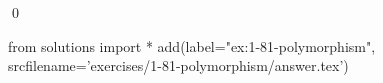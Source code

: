 
\begin{ex}
  \label{ex:1-81-polymorphism}
  
  \qed
\end{ex}
\begin{python0}
from solutions import *
add(label="ex:1-81-polymorphism",
    srcfilename='exercises/1-81-polymorphism/answer.tex')
\end{python0}
